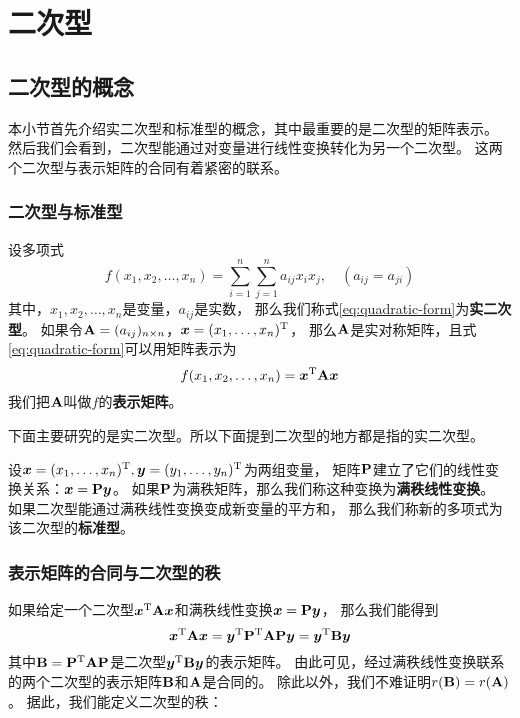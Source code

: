 \chapter{二次型}

\section{二次型的概念}
本小节首先介绍实二次型和标准型的概念，其中最重要的是二次型的矩阵表示。
然后我们会看到，二次型能通过对变量进行线性变换转化为另一个二次型。
这两个二次型与表示矩阵的合同有着紧密的联系。

\subsection{二次型与标准型}
\begin{definition}[实二次型及其矩阵表示]
  设多项式
  \begin{equation} \label{eq:quadratic-form}
    f(x_1,x_2,\dots,x_n)=\sum_{i=1}^n\sum_{j=1}^n a_{ij}x_ix_j,
    \quad (a_{ij} = a_{ji})
  \end{equation}
  其中，$x_1,x_2,\dots,x_n$是变量，$a_{ij}$是实数，
  那么我们称式\eqref{eq:quadratic-form}为\textbf{实二次型}。
  如果令$\mathbf{A}=(a_{ij})_{n\times n}$，$\bm{x}=(x_1,\dots,x_n)^{\textrm{T}}$，
  那么$\mathbf{A}$是实对称矩阵，且式\eqref{eq:quadratic-form}可以用矩阵表示为
  \begin{displaymath}
    f(x_1,x_2,\dots,x_n) = \bm{x}^{\textrm{T}}\mathbf{A}\bm{x}
  \end{displaymath}
  我们把$\mathbf{A}$叫做$f$的\textbf{表示矩阵}。
\end{definition}

\begin{remark}
  下面主要研究的是实二次型。所以下面提到二次型的地方都是指的实二次型。
\end{remark}

\begin{definition}[标准型]
  设$\bm{x}=(x_1,\dots,x_n)^{\textrm{T}},\bm{y}=(y_1,\dots,y_n)^{\textrm{T}}$为两组变量，
  矩阵$\mathbf{P}$建立了它们的线性变换关系：$\bm{x}=\mathbf{P}\bm{y}$。
  如果$\mathbf{P}$为满秩矩阵，那么我们称这种变换为\textbf{满秩线性变换}。
  如果二次型能通过满秩线性变换变成新变量的平方和，
  那么我们称新的多项式为该二次型的\textbf{标准型}。
\end{definition}

\subsection{表示矩阵的合同与二次型的秩}
如果给定一个二次型$\bm{x}^{\textrm{T}}\mathbf{A}\bm{x}$和满秩线性变换$\bm{x}=\mathbf{P}\bm{y}$，
那么我们能得到
\begin{displaymath}
\bm{x}^{\textrm{T}}\mathbf{A}\bm{x}
= \bm{y}^{\textrm{T}}\mathbf{P}^{\textrm{T}}\mathbf{A}\mathbf{P}\bm{y}
= \bm{y}^{\textrm{T}}\mathbf{B}\bm{y}
\end{displaymath}
其中$\mathbf{B}=\mathbf{P}^{\textrm{T}}\mathbf{A}\mathbf{P}$是二次型$\bm{y}^{\textrm{T}}\mathbf{B}\bm{y}$的表示矩阵。
由此可见，经过满秩线性变换联系的两个二次型的表示矩阵$\mathbf{B}$和$\mathbf{A}$是合同的。
除此以外，我们不难证明$r(\mathbf{B})=r(\mathbf{A})$。
据此，我们能定义二次型的秩：

